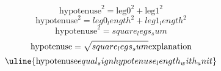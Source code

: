 \[\text{{{hypotenuse}}}^{{2}}=\text{{{leg0}}}^{{2}}+\text{{{leg1}}}^{{2}}\]
\[\text{{{hypotenuse}}}^{{2}}={leg0_length}^{{2}}+{leg1_length}^{{2}}\]
\[\text{{{hypotenuse}}}^{{2}}={square_legs_sum}\]
\[\text{{{hypotenuse}}}=\sqrt{{\mathstrut {square_legs_sum}}}\text{{{explanation}}}\]
\[\uline{{\text{{{hypotenuse}}}{equal_sign}{hypotenuse_length_with_unit}}}\]